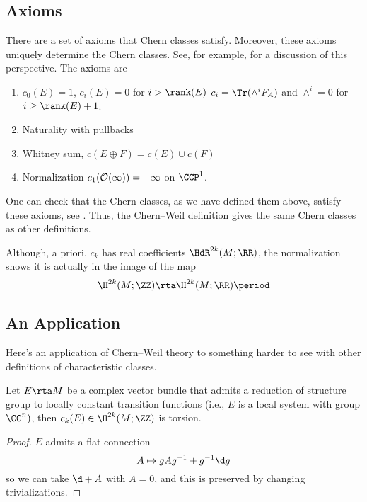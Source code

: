 
\subsection{Axioms}

There are a set of axioms that Chern classes satisfy. 
Moreover, these axioms uniquely determine the Chern classes. 
See, for example, \cite[\S 4]{MilnorStasheff} for a discussion of this perspective. 
The axioms are
\begin{enumerate}[(1)]
\item $c_0(E)=1$, $c_i(E)=0$ for $i>\rank(E)$
\subitem $c_i=\Tr(\wedge^iF_A)$ and $\wedge^i=0$ for $i\geq\rank(E)+1$.
\item Naturality with pullbacks
\item Whitney sum, $c(E\oplus F)=c(E)\cup c(F)$
\item Normalization $c_1(\cal{O}(1))=-1$ on $\CCP^1$.
\end{enumerate}
One can check that the Chern classes, as we have defined them above, 
satisfy these axioms, see \cite[Appendix C]{MilnorStasheff}. 
Thus, the Chern--Weil definition gives the same Chern classes as other definitions.
\begin{remark}
Although, a priori, $c_k$ has real coefficients $\HdR^{2k}(M;\RR)$, the normalization shows it is actually in the image of the map
\[\H^{2k}(M;\ZZ)\rta \H^{2k}(M;\RR)\period\]
\end{remark}


\subsection{An Application}

Here's an application of Chern--Weil theory to something harder to see with other definitions of characteristic classes.
\begin{lem}
Let $E\rta M$ be a complex vector bundle that admits a reduction of structure group to locally constant transition functions (i.e., $E$ is a local system with group $\CC^n)$, then $c_k(E)\in \H^{2k}(M;\ZZ)$ is torsion.
\end{lem}
\begin{proof}
$E$ admits a flat connection 
\[A\mapsto gAg^{-1}+g^{-1}\d g\]
so we can take $ \d+A $  with $A=0$, and this is preserved by changing trivializations.
\end{proof}

